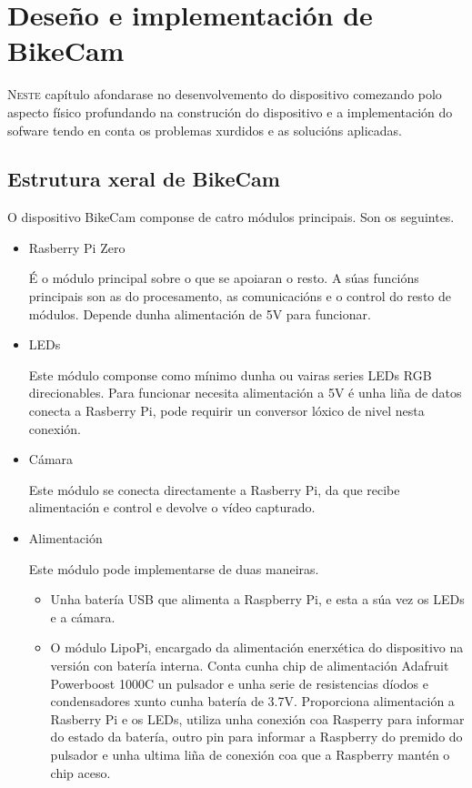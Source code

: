 \chapter{Deseño e implementación de BikeCam}
\label{chap:implementacion_dispositivo}
\lettrine{N}{este} capítulo afondarase no desenvolvemento do dispositivo comezando polo aspecto físico profundando na construción do dispositivo e a implementación do sofware tendo en conta os problemas xurdidos e as solucións aplicadas.

\section{Estrutura xeral de BikeCam}
O dispositivo BikeCam componse de catro módulos principais. Son os seguintes.
\begin{itemize}
  \item Rasberry Pi Zero

    É o módulo principal sobre o que se apoiaran o resto. A súas funcións principais son as do procesamento, as comunicacións e o control do resto de módulos. Depende dunha alimentación de 5V para funcionar.
  \item LEDs

    Este módulo componse como mínimo dunha ou vairas series LEDs RGB direcionables. Para funcionar necesita alimentación a 5V é unha liña de datos conecta a Rasberry Pi, pode requirir un conversor lóxico de nivel nesta conexión.
  \item Cámara

    Este módulo se conecta directamente a Rasberry Pi, da que recibe alimentación e control e devolve o vídeo capturado.

  \item Alimentación

    Este módulo pode implementarse de duas maneiras.
    \begin{itemize}
      \item Unha batería USB que alimenta a Raspberry Pi, e esta a súa vez os LEDs e a cámara.
      \item O módulo LipoPi, encargado da alimentación enerxética do dispositivo na versión con batería interna. Conta cunha chip de alimentación Adafruit Powerboost 1000C un pulsador e unha serie de resistencias díodos e condensadores xunto cunha batería de 3.7V. Proporciona alimentación a Rasberry Pi e os LEDs, utiliza unha conexión coa Rasperry para informar do estado da batería, outro pin para informar a Raspberry do premido do pulsador e unha ultima liña de conexión coa que a Raspberry mantén o chip aceso.
    \end{itemize}
\end{itemize}

